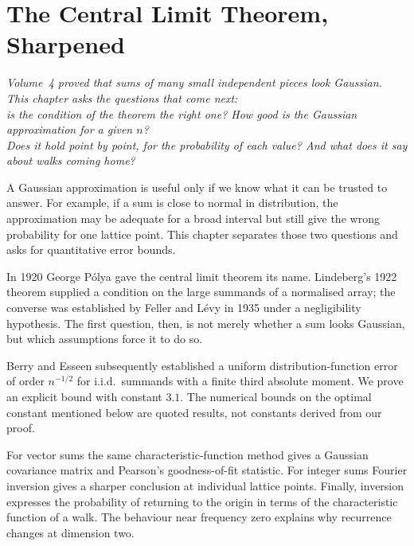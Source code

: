 \chapter{The Central Limit Theorem, Sharpened}
\begin{center}\itshape
Volume~4 proved that sums of many small independent pieces look Gaussian. This chapter asks the questions that come next:\\
is the condition of the theorem the right one? How good is the Gaussian approximation for a given $n$?\\
Does it hold point by point, for the probability of each value? And what does it say about walks coming home?
\end{center}

A Gaussian approximation is useful only if we know what it can be trusted to answer. For example, if a sum is close to normal in distribution, the approximation may be adequate for a broad interval but still give the wrong probability for one lattice point. This chapter separates those two questions and asks for quantitative error bounds.

In 1920 George P\'olya gave the central limit theorem its name. Lindeberg's 1922 theorem supplied a condition on the large summands of a normalised array; the converse was established by Feller and L\'evy in 1935 under a negligibility hypothesis. The first question, then, is not merely whether a sum looks Gaussian, but which assumptions force it to do so.

Berry and Esseen subsequently established a uniform distribution-function error of order $n^{-1/2}$ for i.i.d.\ summands with a finite third absolute moment. We prove an explicit bound with constant $3.1$. The numerical bounds on the optimal constant mentioned below are quoted results, not constants derived from our proof.

For vector sums the same characteristic-function method gives a Gaussian covariance matrix and Pearson's goodness-of-fit statistic. For integer sums Fourier inversion gives a sharper conclusion at individual lattice points. Finally, inversion expresses the probability of returning to the origin in terms of the characteristic function of a walk. The behaviour near frequency zero explains why recurrence changes at dimension two.

